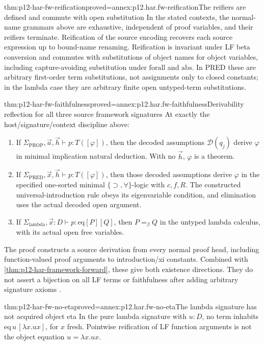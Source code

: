 \begin{hblemma}{thm:p12-har-fw-reification}{proved=annex:p12.har.fw-reification}{The reifiers are defined and commute with open substitution}
In the stated contexts, the normal-name grammars above are exhaustive,
independent of proof variables, and their reifiers terminate. Reification
of the source encoding recovers each source expression up to bound-name
renaming. Reification is invariant under LF beta conversion and commutes
with substitutions of object names for object variables, including
capture-avoiding substitution under \(\mathrm{forall}\) and
\(\mathrm{abs}\). In PRED these are arbitrary first-order term
substitutions, not assignments only to closed constants; in the lambda
case they are arbitrary finite open untyped-term substitutions.
\end{hblemma}

\begin{hbtheorem}{thm:p12-har-fw-faithfulness}{proved=annex:p12.har.fw-faithfulness}{Derivability reflection for all three source framework signatures}
At exactly the host/signature/context discipline above:
\begin{enumerate}
 \item If \(\Sigma_{\mathrm{PROP}},\vec a,\vec h
 \vdash p:T([\varphi])\), then the decoded assumptions
 \(\mathcal D(q_j)\) derive \(\varphi\) in minimal implication
 natural deduction. With no \(\vec h\), \(\varphi\) is a theorem.
 \item If \(\Sigma_{\mathrm{PRED}},\vec x,\vec h
 \vdash p:T([\varphi])\), then those decoded assumptions derive
 \(\varphi\) in the specified one-sorted minimal
 \(\{\supset,\forall\}\)-logic with \(c,f,R\).
 The constructed universal-introduction rule obeys its eigenvariable
 condition, and elimination uses the actual decoded open argument.
 \item If \(\Sigma_{\mathrm{lambda}},\vec x:D
 \vdash p:\mathrm{eq}[P][Q]\), then \(P=_\beta Q\)
 in the untyped lambda calculus, with its actual open free variables.
\end{enumerate}
The proof constructs a source derivation from every normal proof head,
including function-valued proof arguments to introduction/xi constants.
Combined with \cref{thm:p12-har-framework-forward}, these give both
existence directions. They do not assert a bijection on all LF terms or
faithfulness after adding arbitrary signature axioms
\cite[pp.~1161--1163]{BarendregtGeuvers2001}.
\end{hbtheorem}

\begin{hbcorollary}{thm:p12-har-fw-no-eta}{proved=annex:p12.har.fw-no-eta}{The lambda signature has not acquired object eta}
In the pure lambda signature with \(u:D\), no term inhabits
\(\mathrm{eq}\,u\,[\lambda x.ux]\), for \(x\) fresh.
Pointwise reification of LF function arguments is not the object
equation \(u=\lambda x.ux\).
\end{hbcorollary}


